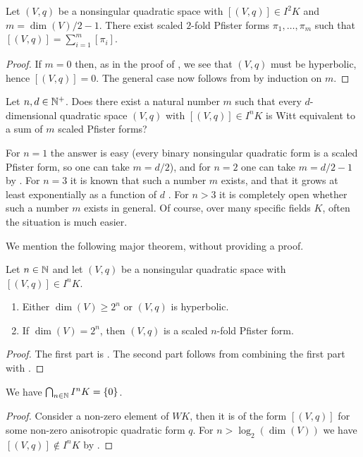 \documentclass[12pt, leqno, british]{amsart}
\begin{document}
\begin{prop}\label{P:boundI2}
Let $(V, q)$ be a nonsingular quadratic space with $[(V, q)] \in I^2K$ and $m = \dim(V)/2 - 1$.
There exist scaled $2$-fold Pfister forms $\pi_1, \ldots, \pi_m$ such that
$ [(V, q)] = \sum_{i=1}^m [\pi_i] $.
\end{prop}
\begin{proof}
If $m = 0$ then, as in the proof of , we see that $(V, q)$ must be hyperbolic, hence $[(V, q)] = 0$.
The general case now follows from  by induction on $m$.
\end{proof}
\begin{ques}\label{Q:boundIn}
Let $n, d \in \mathbb N^+$.
Does there exist a natural number $m$ such that every $d$-dimensional quadratic space $(V, q)$ with $[(V, q)] \in I^n K$ is Witt equivalent to a sum of $m$ scaled Pfister forms?
\end{ques}
For $n = 1$ the answer is easy (every binary nonsingular quadratic form is a scaled Pfister form, so one can take $m = d/2$), and for $n = 2$ one can take $m = d/2 - 1$ by .
For $n = 3$ it is known that such a number $m$ exists, and that it grows at least exponentially as a function of $d$ \autocite{EssentialDimensionI3K}.
For $n > 3$ it is completely open whether such a number $m$ exists in general.
Of course, over many specific fields $K$, often the situation is much easier.

We mention the following major theorem, without providing a proof.
\begin{thm}\label{T:Arason-Pfister}
Let $n \in \mathbb N$ and let $(V, q)$ be a nonsingular quadratic space with $[(V, q)] \in I^n K$.
\begin{enumerate}
\item Either $\dim(V) \geq 2^n$ or $(V, q)$ is hyperbolic.
\item If $\dim(V) = 2^n$, then $(V, q)$ is a scaled $n$-fold Pfister form.
\end{enumerate}
\end{thm}
\begin{proof}
The first part is \autocite[Theorem 23.7]{ElmanKarpenkoMerkurjev}.
The second part follows from combining the first part with .
\end{proof}
\begin{cor}
We have $\bigcap_{n \in \mathbb N} I^n K = \lbrace 0 \rbrace$.
\end{cor}
\begin{proof}
Consider a non-zero element of $WK$, then it is of the form $[(V, q)]$ for some non-zero anisotropic quadratic form $q$.
For $n > \log_2(\dim(V))$ we have $[(V, q)] \not\in I^n K$ by .
\end{proof}
\end{document}
